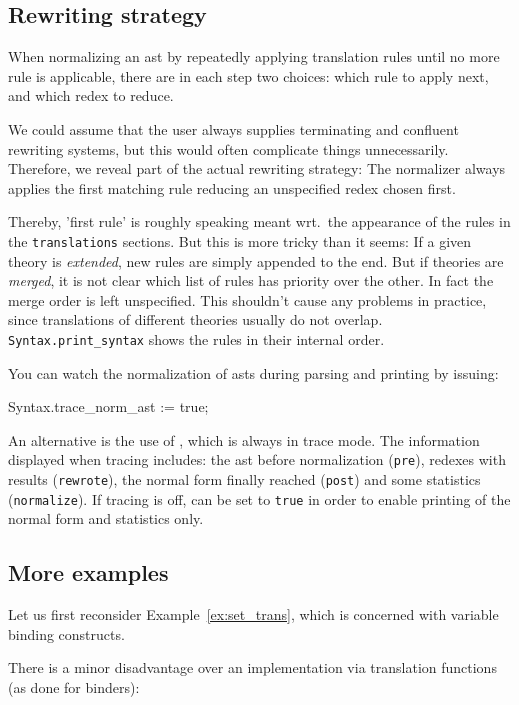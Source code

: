 \subsection{Rewriting strategy}

When normalizing an ast by repeatedly applying translation rules until no
more rule is applicable, there are in each step two choices: which rule to
apply next, and which redex to reduce.

We could assume that the user always supplies terminating and confluent
rewriting systems, but this would often complicate things unnecessarily.
Therefore, we reveal part of the actual rewriting strategy: The normalizer
always applies the first matching rule reducing an unspecified redex chosen
first.

Thereby, 'first rule' is roughly speaking meant wrt.\ the appearance of the
rules in the {\tt translations} sections. But this is more tricky than it
seems: If a given theory is {\em extended}, new rules are simply appended to
the end. But if theories are {\em merged}, it is not clear which list of
rules has priority over the other. In fact the merge order is left
unspecified. This shouldn't cause any problems in practice, since
translations of different theories usually do not overlap. {\tt
Syntax.print_syntax} shows the rules in their internal order.

\medskip
You can watch the normalization of asts during parsing and printing by
issuing: 
\begin{ttbox}
Syntax.trace_norm_ast := true;
\end{ttbox}
An alternative is the use of , which is always in
trace mode. The information displayed when tracing
includes: the ast before normalization ({\tt pre}), redexes with results
({\tt rewrote}), the normal form finally reached ({\tt post}) and some
statistics ({\tt normalize}). If tracing is off,
 can be set to {\tt true} in order to enable
printing of the normal form and statistics only.


\subsection{More examples}

Let us first reconsider Example~\ref{ex:set_trans}, which is concerned with
variable binding constructs.

There is a minor disadvantage over an implementation via translation
functions (as done for binders):

